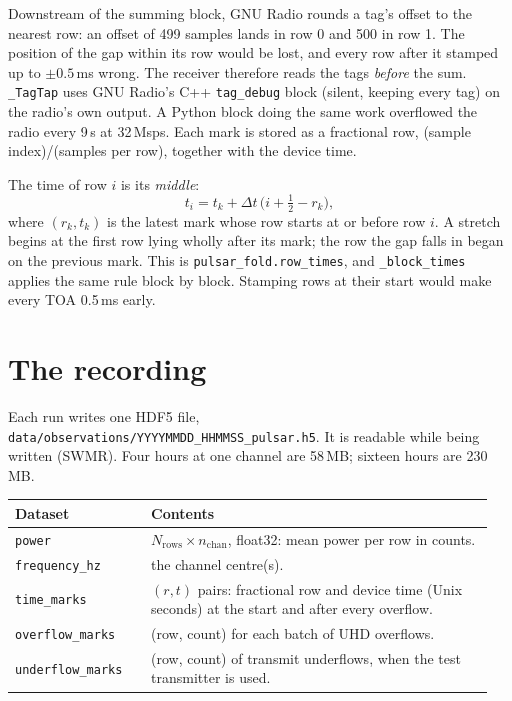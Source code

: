 \documentclass[11pt,a4paper]{article}
\newcommand{\code}[1]{\texttt{#1}}
\begin{document}
Downstream of the summing block, GNU Radio rounds a tag's offset to the nearest row: an offset of 499 samples lands in row 0 and 500 in row 1. The position of the gap within its row would be lost, and every row after it stamped up to $\pm0.5$\,ms wrong. The receiver therefore reads the tags \emph{before} the sum. \code{\_TagTap} uses GNU Radio's C++ \code{tag\_debug} block (silent, keeping every tag) on the radio's own output. A Python block doing the same work overflowed the radio every 9\,s at 32\,Msps. Each mark is stored as a fractional row, (sample index)/(samples per row), together with the device time.

The time of row $i$ is its \emph{middle}:
\begin{equation}
t_i = t_k + \Delta t\,\bigl(i + \tfrac12 - r_k\bigr),
\end{equation}
where $(r_k, t_k)$ is the latest mark whose row starts at or before row $i$. A stretch begins at the first row lying wholly after its mark; the row the gap falls in began on the previous mark. This is \code{pulsar\_fold.row\_times}, and \code{\_block\_times} applies the same rule block by block. Stamping rows at their start would make every TOA 0.5\,ms early.

\section{The recording}
\label{sec:file}

Each run writes one HDF5 file, \code{data/observations/YYYYMMDD\_HHMMSS\_pulsar.h5}. It is readable while being written (SWMR). Four hours at one channel are 58\,MB; sixteen hours are 230\,MB.

\begin{longtable}{@{}p{0.27\linewidth}p{0.68\linewidth}@{}}
\toprule
Dataset & Contents \\
\midrule
\code{power} & $N_\mathrm{rows}\times n_\mathrm{chan}$, float32: mean power per row in counts. \\
\code{frequency\_hz} & the channel centre(s). \\
\code{time\_marks} & $(r, t)$ pairs: fractional row and device time (Unix seconds) at the start and after every overflow. \\
\code{overflow\_marks} & (row, count) for each batch of UHD overflows. \\
\code{underflow\_marks} & (row, count) of transmit underflows, when the test transmitter is used. \\
\bottomrule
\end{longtable}
\end{document}
